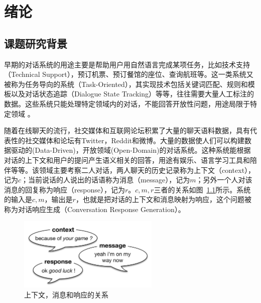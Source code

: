 
\chapter{绪论}\label{ch:introduction}

\section{课题研究背景}\label{sec:research_background}
早期的对话系统的用途主要是帮助用户用自然语言完成某项任务，比如技术支持（Technical Support），预订机票、预订餐馆的座位、查询航班等。这一类系统又被称为任务导向的系统（Task-Oriented），其实现技术包括关键词匹配、规则和模板以及对话状态追踪（Dialogue State Tracking）等等，往往需要大量人工标注的数据。这些系统只能处理特定领域内的对话，不能回答开放性问题，用途局限于特定领域
。

随着在线聊天的流行，社交媒体和互联网论坛积累了大量的聊天语料数据，具有代表性的社交媒体和论坛有Twitter，Reddit和微博。大量的数据使人们可以构建数据驱动的(Data-Driven)，开放领域(Open-Domain)的对话系统。这种系统能根据对话的上下文和用户的提问产生语义相关的回答，用途有娱乐、语言学习工具和陪伴等等。该领域主要考察二人对话，两人聊天的历史记录称为上下文（context），记为$c$；当前说话的人说出的话语称为消息（message），记为$m$；另外一个人对该消息的回复称为响应（response），记为$r$。$c,m,r$三者的关系如图~\ref{fig:context_message_response}所示。系统的输入是$c,m$，输出是$r$，也就是把对话的上下文和消息映射为响应，这个问题被称为对话响应生成（Conversation Response Generation）。

\begin{figure}[H]
    \includegraphics[width=0.6\textwidth]{figure/context_message_response.png}
    \centering
    \caption{上下文，消息和响应的关系}
    \label{fig:context_message_response}
\end{figure}

